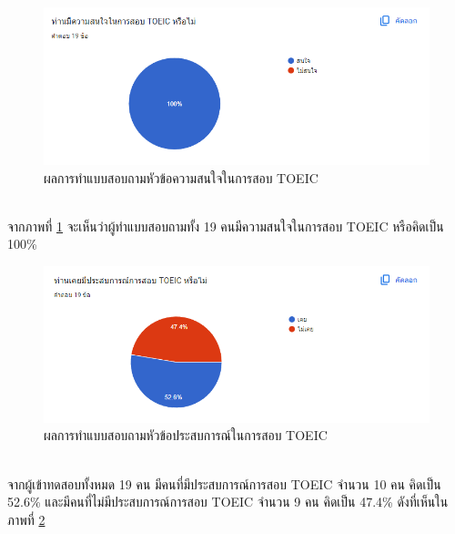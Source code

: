 \documentclass[12pt,oneside,openright,a4paper]{cpe-thai-project}
\begin{document}
\begin{figure}[!h]\centering
	\includegraphics[width=\textwidth, keepaspectratio=true]{image/appendix/1st/toeic interest.png}
	\caption{{ผลการทำแบบสอบถามหัวข้อความสนใจในการสอบ TOEIC}}\label{fig:apdxTOEICInterest}
\end{figure}

\hspace{1cm}
\\ จากภาพที่ \ref{fig:apdxTOEICInterest} จะเห็นว่าผู้ทำแบบสอบถามทั้ง 19 คนมีความสนใจในการสอบ TOEIC หรือคิดเป็น 100\%

\begin{figure}[!h]\centering
	\includegraphics[width=\textwidth, keepaspectratio=true]{image/appendix/1st/exp.png}
	\caption{{ผลการทำแบบสอบถามหัวข้อประสบการณ์ในการสอบ TOEIC}}\label{fig:apdxTOEICEXP}
\end{figure} 
\hspace{1cm}
\\ จากผู้เข้าทดสอบทั้งหมด 19 คน มีคนที่มีประสบการณ์การสอบ TOEIC จำนวน 10 คน คิดเป็น 52.6\% 
และมีคนที่ไม่มีประสบการณ์การสอบ TOEIC จำนวน 9 คน คิดเป็น 47.4\% ดังที่เห็นในภาพที่ \ref{fig:apdxTOEICEXP}
\end{document}
